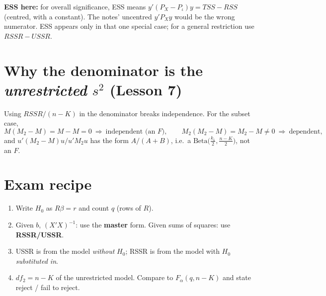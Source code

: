 \documentclass[11pt]{article}
\begin{document}
\begin{why}
\textbf{ESS here:} for overall significance, ESS means $y'(P_X-P_\iota)y=TSS-RSS$ (centred, with a
constant). The notes' uncentred $y'P_Xy$ would be the wrong numerator. ESS appears only in that
one special case; for a general restriction use $RSSR-USSR$.
\end{why}

\section{Why the denominator is the \emph{unrestricted} $s^{2}$ (Lesson 7)}
Using $RSSR/(n-K)$ in the denominator breaks independence. For the subset case,
\[ M(M_2-M)=M-M=0\ \Rightarrow\ \text{independent (an $F$)},\qquad
   M_2(M_2-M)=M_2-M\ne0\ \Rightarrow\ \text{dependent}, \]
and $u'(M_2-M)u/u'M_2u$ has the form $A/(A+B)$, i.e.\ a $\mathrm{Beta}\bigl(\tfrac{k_1}{2},\tfrac{n-K}{2}\bigr)$,
not an $F$.

\section{Exam recipe}
\begin{enumerate}[label=\arabic*.]
  \item Write $H_0$ as $R\beta=r$ and count $q$ (rows of $R$).
  \item Given $b$, $(X'X)^{-1}$: use the \textbf{master} form. Given sums of squares: use \textbf{RSSR/USSR}.
  \item USSR is from the model \emph{without} $H_0$; RSSR is from the model with $H_0$ \emph{substituted in}.
  \item $df_2=n-K$ of the unrestricted model. Compare to $F_{\alpha}(q,n-K)$ and state reject / fail to reject.
\end{enumerate}
\end{document}
